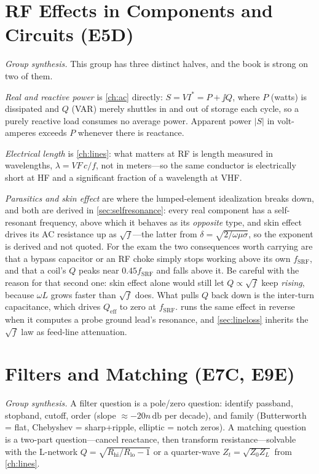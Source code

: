 \section{RF Effects in Components and Circuits (E5D)}
\emph{Group synthesis.}
This group has three distinct halves, and the book is strong on two of them.

\emph{Real and reactive power} is \cref{ch:ac} directly: \(S=VI^{*}=P+\jj Q\), where
\(P\) (watts) is dissipated and \(Q\) (VAR) merely shuttles in and out of storage each
cycle, so a purely reactive load consumes no average power. Apparent power \(|S|\) in
volt-amperes exceeds \(P\) whenever there is reactance.

\emph{Electrical length} is \cref{ch:lines}: what matters at RF is length measured in
wavelengths, \(\lambda=VF\,c/f\), not in meters---so the same conductor is
electrically short at HF and a significant fraction of a wavelength at VHF.

\emph{Parasitics and skin effect} are where the lumped-element idealization breaks
down, and both are derived in \cref{sec:selfresonance}: every real component has a
self-resonant frequency, above which it behaves as its \emph{opposite} type, and skin
effect drives its AC resistance up as \(\sqrt f\)---the latter from \(\delta=\sqrt{2/\omega\mu\sigma}\),
so the exponent is derived and not quoted. For the exam the two consequences
worth carrying are that a bypass capacitor or an RF choke simply stops working above
its own \(f_{\mathrm{SRF}}\), and that a coil's \(Q\) peaks near
\(0.45f_{\mathrm{SRF}}\) and falls above it. Be careful with the reason for that
second one: skin effect alone would still let \(Q\propto\sqrt f\) keep \emph{rising},
because \(\omega L\) grows faster than \(\sqrt f\) does. What pulls \(Q\) back down is
the inter-turn capacitance, which drives \(Q_{\mathrm{eff}}\) to zero at
\(f_{\mathrm{SRF}}\).  runs the same
effect in reverse when it computes a probe ground lead's resonance, and
\cref{sec:lineloss} inherits the \(\sqrt f\) law as feed-line attenuation.

\section{Filters and Matching (E7C, E9E)}
\emph{Group synthesis.}
A filter question is a pole/zero question: identify passband, stopband, cutoff,
order (slope \(\approx-20n\,\si{\decibel}\) per decade), and family
(Butterworth = flat, Chebyshev = sharp+ripple, elliptic = notch zeros). A
matching question is a two-part question---cancel reactance, then transform
resistance---solvable with the L-network \(Q=\sqrt{R_{\text{hi}}/R_{\text{lo}}-1}\)
or a quarter-wave \(Z_t=\sqrt{Z_0Z_L}\) from \cref{ch:lines}.

